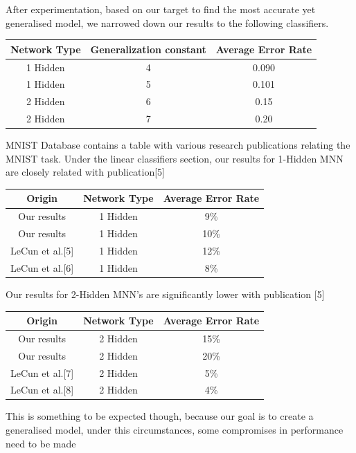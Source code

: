 \documentclass{proc}
\begin{document}
	After experimentation, based on our target to find the most accurate yet generalised model, we narrowed down our results to the following classifiers.
	
	\begin{center}
		\begin{tabular}{ |c|c|c| }
			\hline
			Network Type&Generalization constant &Average Error Rate \\
			\hline
			1 Hidden &4  & 0.090 \\
			1 Hidden &5  & 0.101 \\
			2 Hidden &6  & 0.15 \\
			2 Hidden &7  & 0.20 \\
			\hline
		\end{tabular}
	\end{center}

	MNIST Database contains a table with various research publications relating the MNIST task. Under the linear classifiers section, our results for 1-Hidden MNN are closely related with publication[5]
	
	\begin{center}
		\begin{tabular}{ |c|c|c| }
			\hline
			Origin&Network Type&Average Error Rate \\
			\hline
			Our results&1 Hidden& 9\% \\
			Our results&1 Hidden& 10\% \\
			LeCun et al.[5]&1 Hidden  & 12\% \\
			LeCun et al.[6]&1 Hidden  & 8\% \\
			\hline
		\end{tabular}
	\end{center}
 
	Our results for 2-Hidden MNN's are significantly lower with publication [5]
	\begin{center}
		\begin{tabular}{ |c|c|c| }
			\hline
			Origin&Network Type&Average Error Rate \\
			\hline
			Our results&2 Hidden& 15\% \\
			Our results&2 Hidden& 20\% \\
			LeCun et al.[7]&2 Hidden  & 5\% \\
			LeCun et al.[8]&2 Hidden  & 4\% \\
			\hline
		\end{tabular}
	\end{center}

	This is something to be expected though, because our goal is to create a generalised model, under this circumstances, some compromises in performance need to be made
	
\end{document}
